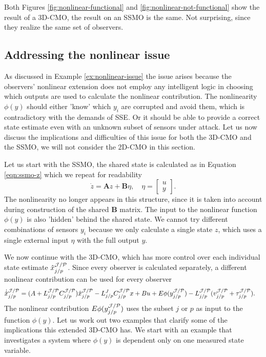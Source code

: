 Both Figures \ref{fig:nonlinear-functional} and \ref{fig:nonlinear-not-functional} show the result of a 3D-CMO, the result on an SSMO is the same. Not surprising, since they realize the same set of observers.

\subsection{Addressing the nonlinear issue}
As discussed in Example \ref{ex:nonlinear-issue} the issue arises because the observers' nonlinear extension does not employ any intelligent logic in choosing which outputs are used to calculate the nonlinear contribution. The nonlinearity $\phi(y)$ should either 'know' which $y_i$ are corrupted and avoid them, which is contradictory with the demands of SSE. Or it should be able to provide a correct state estimate even with an unknown subset of sensors under attack. Let us now discuss the implications and difficulties of this issue for both the 3D-CMO and the SSMO, we will not consider the 2D-CMO in this section. 

Let us start with the SSMO, the shared state is calculated as in Equation \eqref{eqn:ssmo-z} which we repeat for readability
\begin{equation*}
    \dot{z} = \mathbf{A}z + \mathbf{B}\eta, \quad \eta = 
    \begin{bmatrix}
        u \\ y
    \end{bmatrix}.
\end{equation*}
The nonlinearity no longer appears in this structure, since it is taken into account during construction of the shared $\mathbf{B}$ matrix. The input to the nonlinear function $\phi(y)$ is also 'hidden' behind the shared state. We cannot try different combinations of sensors $y_i$ because we only calculate a single state $z$, which uses a single external input $\eta$ with the full output $y$.

We now continue with the 3D-CMO, which has more control over each individual state estimate $\hat{x}^{\mathcal{J}/\mathcal{P}}_{j/p}$. Since every observer is calculated separately, a different nonlinear contribution can be used for every observer
\begin{equation}\label{eqn:ext-NL-observer}
    \begin{split}
        \dot{\hat{x}}_{j/p}^{\mathcal{J}/\mathcal{P}} &= (A + L_{j/p}^{\mathcal{J}/\mathcal{P}}C_{j/p}^{\mathcal{J}/\mathcal{P}})\hat{x}^{\mathcal{J}/\mathcal{P}}_{j/p} - L_{j/p}^JC_{j/p}^{\mathcal{J}/\mathcal{P}}x + Bu + E\phi(y^{\mathcal{J}/\mathcal{P}}_{j/p}) - L_{j/p}^{\mathcal{J}/\mathcal{P}}(v_{j/p}^{\mathcal{J}/\mathcal{P}} + \tau_{j/p}^{\mathcal{J}/\mathcal{P}}).
    \end{split}
\end{equation}
The nonlinear contribution $E\phi(y^{\mathcal{J}/\mathcal{P}}_{j/p})$ uses the subset $j$ or $p$ as input to the function $\phi(y)$. Let us work out two examples that clarify some of the implications this extended 3D-CMO has. We start with an example that investigates a system where $\phi(y)$ is dependent only on one measured state variable.

